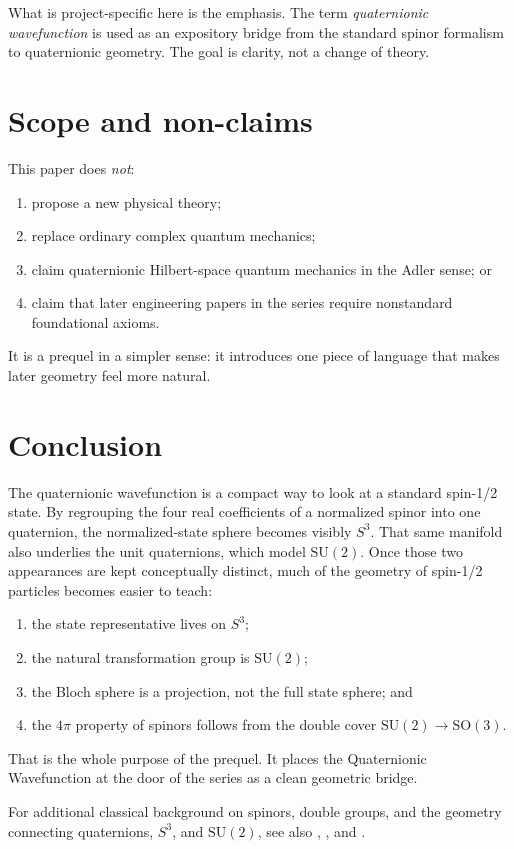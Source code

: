 \documentclass[11pt]{article}
\theoremstyle{remark}
\newcommand{\SU}{\mathrm{SU}}
\newcommand{\SO}{\mathrm{SO}}
\begin{document}
What is project-specific here is the emphasis. The term \emph{quaternionic wavefunction} is used as an expository bridge from the standard spinor formalism to quaternionic geometry. The goal is clarity, not a change of theory.

\section{Scope and non-claims}

This paper does \emph{not}:
\begin{enumerate}
\item propose a new physical theory;
\item replace ordinary complex quantum mechanics;
\item claim quaternionic Hilbert-space quantum mechanics in the Adler sense; or
\item claim that later engineering papers in the series require nonstandard foundational axioms.
\end{enumerate}

It is a prequel in a simpler sense: it introduces one piece of language that makes later geometry feel more natural.

\section{Conclusion}

The quaternionic wavefunction is a compact way to look at a standard spin-1/2 state. By regrouping the four real coefficients of a normalized spinor into one quaternion, the normalized-state sphere becomes visibly $S^3$. That same manifold also underlies the unit quaternions, which model $\SU(2)$. Once those two appearances are kept conceptually distinct, much of the geometry of spin-1/2 particles becomes easier to teach:
\begin{enumerate}
\item the state representative lives on $S^3$;
\item the natural transformation group is $\SU(2)$;
\item the Bloch sphere is a projection, not the full state sphere; and
\item the $4\pi$ property of spinors follows from the double cover $\SU(2)\to\SO(3)$.
\end{enumerate}

That is the whole purpose of the prequel. It places the Quaternionic Wavefunction at the door of the series as a clean geometric bridge.

For additional classical background on spinors, double groups, and the geometry connecting quaternions, $S^3$, and $\SU(2)$, see also \citet{cartan1981}, \citet{altmann1986}, and \citet{nakahara2003}.



\end{document}
